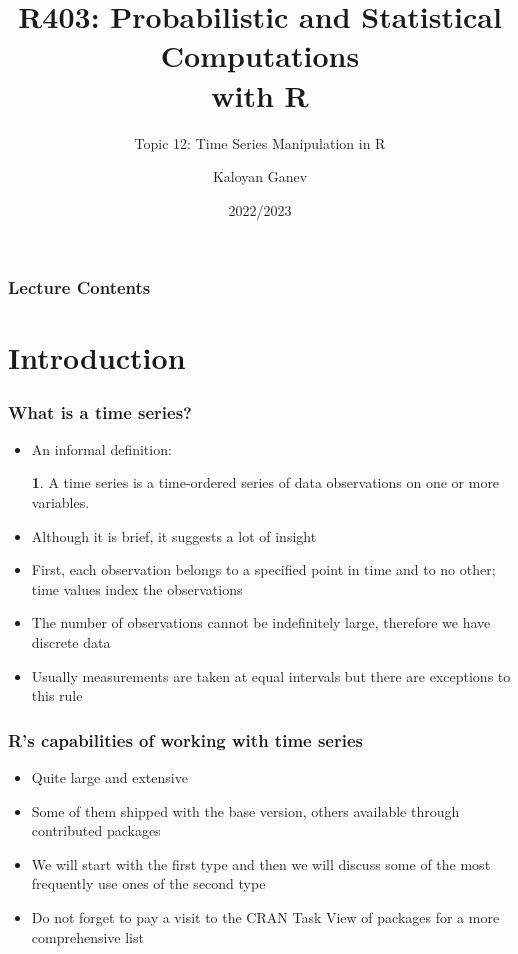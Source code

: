 \documentclass[10pt]{beamer}
\title{R403: Probabilistic and Statistical Computations\\ with R}
\subtitle{Topic 12: \textcolor{myred}{Time Series Manipulation in R}}
\author{Kaloyan Ganev}
\date{2022/2023}
\theoremstyle{definition}
\newtheorem{definition}{\translate{Definition}}
\begin{document}
\maketitle

\begin{frame}[fragile]
\frametitle{Lecture Contents}
\tableofcontents
\end{frame}

\section{Introduction}
\begin{frame}[fragile]
\frametitle{What is a time series?}
\begin{itemize}
	\item An informal definition:
	\begin{definition}	
		A time series is a time-ordered series of data observations on one or more variables.
	\end{definition}
	\item Although it is brief, it suggests a lot of insight
	\item First, each observation belongs to a specified point in time and to no other; time values index the observations
	\item The number of observations cannot be indefinitely large, therefore we have discrete data
	\item Usually measurements are taken at equal intervals but there are exceptions to this rule
\end{itemize}
\end{frame}

\begin{frame}[fragile]
\frametitle{R's capabilities of working with time series}
\begin{itemize}
	\item Quite large and extensive
	\item Some of them shipped with the base version, others available through contributed packages
	\item We will start with the first type and then we will discuss some of the most frequently use ones of the second type
	\item Do not forget to pay a visit to the CRAN Task View of packages for a more comprehensive list
\end{itemize}
\end{frame}
\end{document}
